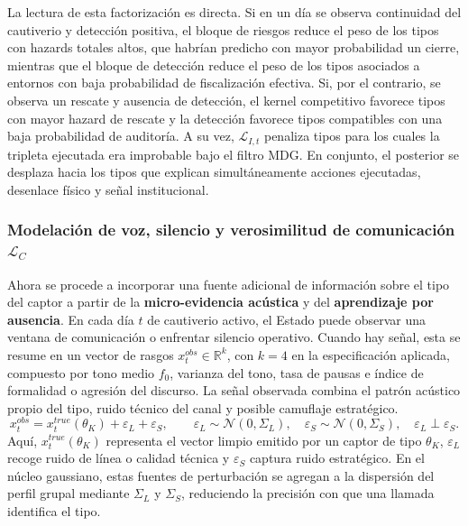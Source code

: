 \documentclass[12pt]{article}
\theoremstyle{definition}
\theoremstyle{remark}
\newcommand{\1}{\mathbf{1}}
\begin{document}
La lectura de esta factorización es directa. Si en un día se observa continuidad del cautiverio y detección positiva, el bloque de riesgos reduce el peso de los tipos con hazards totales altos, que habrían predicho con mayor probabilidad un cierre, mientras que el bloque de detección reduce el peso de los tipos asociados a entornos con baja probabilidad de fiscalización efectiva. Si, por el contrario, se observa un rescate y ausencia de detección, el kernel competitivo favorece tipos con mayor hazard de rescate y la detección favorece tipos compatibles con una baja probabilidad de auditoría. A su vez, $\mathcal{L}_{I,t}$ penaliza tipos para los cuales la tripleta ejecutada era improbable bajo el filtro MDG. En conjunto, el posterior se desplaza hacia los tipos que explican simultáneamente acciones ejecutadas, desenlace físico y señal institucional.

\subsubsection[Modelación de voz y verosimilitud de comunicación]{Modelación de voz, silencio y verosimilitud de comunicación $\mathcal{L}_C$}
\label{subsec:voz}

Ahora se procede a incorporar una fuente adicional de información sobre el tipo del captor a partir de la \textbf{micro-evidencia acústica} y del \textbf{aprendizaje por ausencia}. En cada día $t$ de cautiverio activo, el Estado puede observar una ventana de comunicación o enfrentar silencio operativo. Cuando hay señal, esta se resume en un vector de rasgos $x_t^{obs}\in\mathbb{R}^k$, con $k=4$ en la especificación aplicada, compuesto por tono medio $f_0$, varianza del tono, tasa de pausas e índice de formalidad o agresión del discurso. La señal observada combina el patrón acústico propio del tipo, ruido técnico del canal y posible camuflaje estratégico.
\begin{equation}
\label{eq:voz-descomp}
x_t^{obs}=x_t^{true}(\theta_K)+\varepsilon_L+\varepsilon_S,\qquad \varepsilon_L\sim\mathcal{N}(0,\Sigma_L),\quad \varepsilon_S\sim\mathcal{N}(0,\Sigma_S),\quad \varepsilon_L\perp\varepsilon_S.
\end{equation}
Aquí, $x_t^{true}(\theta_K)$ representa el vector limpio emitido por un captor de tipo $\theta_K$, $\varepsilon_L$ recoge ruido de línea o calidad técnica y $\varepsilon_S$ captura ruido estratégico. En el núcleo gaussiano, estas fuentes de perturbación se agregan a la dispersión del perfil grupal mediante $\Sigma_L$ y $\Sigma_S$, reduciendo la precisión con que una llamada identifica el tipo.
\end{document}
